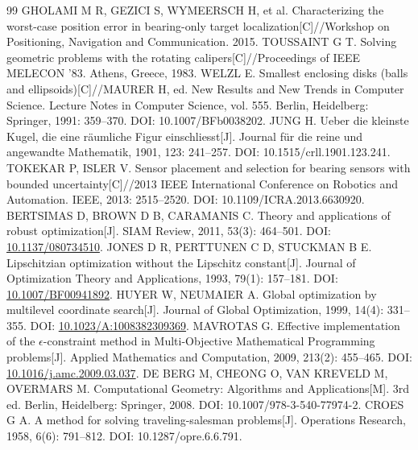 \documentclass{JXUSTmodeling}
\begin{document}
\begin{thebibliography}{99}
 GHOLAMI M R, GEZICI S, WYMEERSCH H, et al. Characterizing the worst-case position error in bearing-only target localization[C]//Workshop on Positioning, Navigation and Communication. 2015.
 TOUSSAINT G T. Solving geometric problems with the rotating calipers[C]//Proceedings of IEEE MELECON '83. Athens, Greece, 1983.
 WELZL E. Smallest enclosing disks (balls and ellipsoids)[C]//MAURER H, ed. New Results and New Trends in Computer Science. Lecture Notes in Computer Science, vol. 555. Berlin, Heidelberg: Springer, 1991: 359--370. DOI: 10.1007/BFb0038202.
 JUNG H. Ueber die kleinste Kugel, die eine räumliche Figur einschliesst[J]. Journal für die reine und angewandte Mathematik, 1901, 123: 241--257. DOI: 10.1515/crll.1901.123.241.
 TOKEKAR P, ISLER V. Sensor placement and selection for bearing sensors with bounded uncertainty[C]//2013 IEEE International Conference on Robotics and Automation. IEEE, 2013: 2515--2520. DOI: 10.1109/ICRA.2013.6630920.
 BERTSIMAS D, BROWN D B, CARAMANIS C. Theory and applications of robust optimization[J]. SIAM Review, 2011, 53(3): 464--501. DOI: \url{10.1137/080734510}.
 JONES D R, PERTTUNEN C D, STUCKMAN B E. Lipschitzian optimization without the Lipschitz constant[J]. Journal of Optimization Theory and Applications, 1993, 79(1): 157--181. DOI: \url{10.1007/BF00941892}.
 HUYER W, NEUMAIER A. Global optimization by multilevel coordinate search[J]. Journal of Global Optimization, 1999, 14(4): 331--355. DOI: \url{10.1023/A:1008382309369}.
 MAVROTAS G. Effective implementation of the $\epsilon$-constraint method in Multi-Objective Mathematical Programming problems[J]. Applied Mathematics and Computation, 2009, 213(2): 455--465. DOI: \url{10.1016/j.amc.2009.03.037}.
 DE BERG M, CHEONG O, VAN KREVELD M, OVERMARS M. Computational Geometry: Algorithms and Applications[M]. 3rd ed. Berlin, Heidelberg: Springer, 2008. DOI: 10.1007/978-3-540-77974-2.
 CROES G A. A method for solving traveling-salesman problems[J]. Operations Research, 1958, 6(6): 791--812. DOI: 10.1287/opre.6.6.791.
\end{thebibliography}
\label{end:body}
\end{document}
